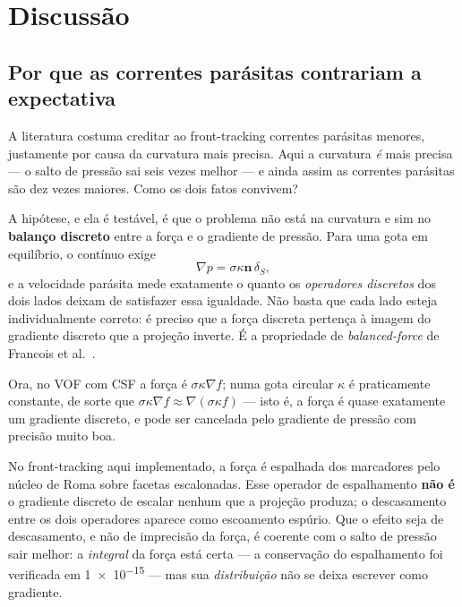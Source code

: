\section{Discuss\~ao}
\label{sec:discussao}

\subsection{Por que as correntes par\'asitas contrariam a expectativa}

A literatura costuma creditar ao front-tracking correntes par\'asitas menores,
justamente por causa da curvatura mais precisa. Aqui a curvatura \emph{\'e} mais
precisa --- o salto de press\~ao sai seis vezes melhor --- e ainda assim as
correntes par\'asitas s\~ao dez vezes maiores. Como os dois fatos convivem?

A hip\'otese, e ela \'e test\'avel, \'e que o problema n\~ao est\'a na curvatura e
sim no \textbf{balan\c{c}o discreto} entre a for\c{c}a e o gradiente de press\~ao.
Para uma gota em equil\'ibrio, o cont\'inuo exige
\begin{equation}
  \nabla p = \sigma\kappa\mathbf{n}\,\delta_S,
  \label{eq:equilibrio}
\end{equation}
e a velocidade par\'asita mede exatamente o quanto os \emph{operadores
discretos} dos dois lados deixam de satisfazer essa igualdade. N\~ao basta que
cada lado esteja individualmente correto: \'e preciso que a for\c{c}a discreta
perten\c{c}a \`a imagem do gradiente discreto que a proje\c{c}\~ao inverte. \'E a
propriedade de \emph{balanced-force} de Francois et al.~\cite{francois2006}.

Ora, no VOF com CSF a for\c{c}a \'e $\sigma\kappa\nabla f$; numa gota circular
$\kappa$ \'e praticamente constante, de sorte que
$\sigma\kappa\nabla f \approx \nabla(\sigma\kappa f)$ --- isto \'e, a for\c{c}a
\'e quase exatamente um gradiente discreto, e pode ser cancelada pelo gradiente
de press\~ao com precis\~ao muito boa.

No front-tracking aqui implementado, a for\c{c}a \'e espalhada dos marcadores
pelo n\'ucleo de Roma sobre facetas escalonadas. Esse operador de espalhamento
\textbf{n\~ao \'e} o gradiente discreto de escalar nenhum que a proje\c{c}\~ao
produza; o descasamento entre os dois operadores aparece como escoamento
espúrio. Que o efeito seja de descasamento, e n\~ao de imprecis\~ao da for\c{c}a,
\'e coerente com o salto de press\~ao sair melhor: a \emph{integral} da for\c{c}a
est\'a certa --- a conserva\c{c}\~ao do espalhamento foi verificada em
\num{1e-15} --- mas sua \emph{distribui\c{c}\~ao} n\~ao se deixa escrever como
gradiente.


